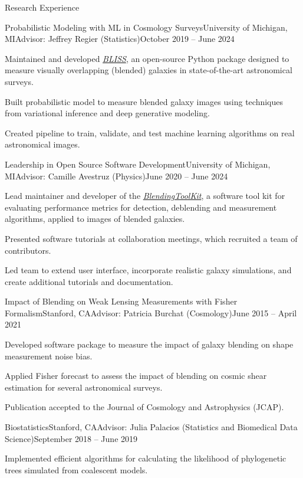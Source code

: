 \documentclass{resume} %
\begin{document}
\begin{rSection}{Research Experience}
\begin{rSubsection}{Probabilistic Modeling with ML in Cosmology Surveys}{University of Michigan, MI}{Advisor: Jeffrey Regier (Statistics)}{October 2019 -- June 2024}
\item Maintained and developed \textit{\href{https://github.com/prob-ml/bliss}{BLISS}}, an open-source Python package designed to measure visually overlapping (blended) galaxies in state-of-the-art astronomical surveys.
\item Built probabilistic model to measure blended galaxy images using techniques from variational inference and deep generative modeling.
\item Created pipeline to train, validate, and test machine learning algorithms on real astronomical images.
\end{rSubsection}

\begin{rSubsection}{Leadership in Open Source Software Development}{University of Michigan, MI}{Advisor: Camille Avestruz (Physics)}{June 2020 -- June 2024}
\item Lead maintainer and developer of the \textit{\href{https://github.com/LSSTDESC/BlendingToolKit}{BlendingToolKit}}, a software tool kit for evaluating performance metrics for detection, deblending and measurement algorithms, applied to images of blended galaxies.
\item Presented software tutorials at collaboration meetings, which recruited a team of contributors.
\item Led team to extend user interface, incorporate realistic galaxy simulations, and create additional tutorials and documentation.
\end{rSubsection}

\begin{rSubsection}{Impact of Blending on Weak Lensing Measurements with Fisher Formalism}{Stanford, CA}{Advisor: Patricia Burchat (Cosmology)}{June 2015 -- April 2021}
\item Developed software package to measure the impact of galaxy blending on shape measurement noise bias.
\item Applied Fisher forecast to assess the impact of blending on cosmic shear estimation for several astronomical surveys.
\item Publication accepted to the Journal of Cosmology and Astrophysics (JCAP). 
\end{rSubsection}

\begin{rSubsection}{Biostatistics}{Stanford, CA}{Advisor: Julia Palacios (Statistics and Biomedical Data Science)}{September 2018 -- June 2019}
\item Implemented efficient algorithms for calculating the likelihood of phylogenetic trees simulated from coalescent models.


\end{rSubsection}
\end{rSection}
\end{document}
